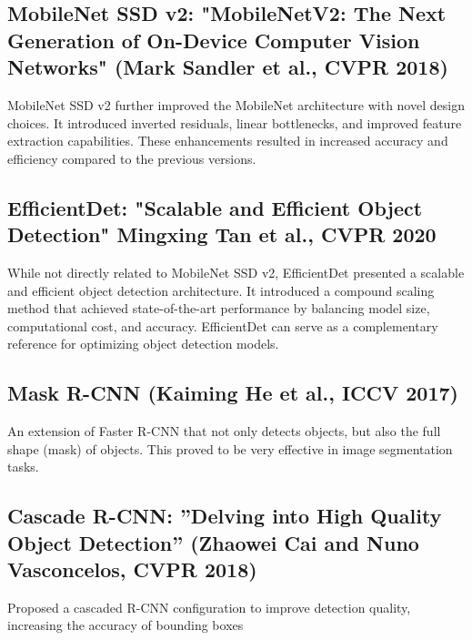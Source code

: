 \subsection{MobileNet SSD v2: "MobileNetV2: The Next Generation of On-Device Computer Vision Networks" (Mark Sandler et al., CVPR 2018)}
MobileNet SSD v2 further improved the MobileNet architecture with novel design choices. It introduced inverted residuals, linear bottlenecks, and improved feature extraction capabilities. These enhancements resulted in increased accuracy and efficiency compared to the previous versions.

\subsection{EfficientDet: "Scalable and Efficient Object Detection" Mingxing Tan et al., CVPR 2020}
While not directly related to MobileNet SSD v2, EfficientDet presented a scalable and efficient object detection architecture. It introduced a compound scaling method that achieved state-of-the-art performance by balancing model size, computational cost, and accuracy. EfficientDet can serve as a complementary reference for optimizing object detection models.

\subsection{Mask R-CNN (Kaiming He et al., ICCV 2017)}
An extension of Faster R-CNN that not only detects objects, but also the full shape (mask) of objects. This proved to be very effective in image segmentation tasks.

\subsection{Cascade R-CNN: ”Delving into High Quality Object Detection” (Zhaowei Cai and Nuno Vasconcelos, CVPR 2018)}
Proposed a cascaded R-CNN configuration to improve detection quality, increasing the accuracy of bounding boxes

